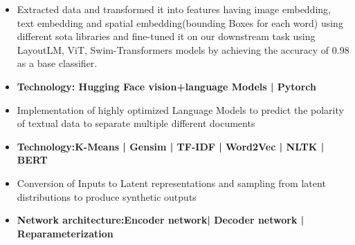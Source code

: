 
\begin{itemize}
\item Extracted data and transformed it into features having image embedding, text embedding and spatial embedding(bounding Boxes for each word) using different sota libraries and fine-tuned it on our downstream task using LayoutLM, ViT, Swim-Transformers models by achieving the accuracy of 0.98 as a base classifier.
\item\bf{Technology}{: Hugging Face vision+language Models | Pytorch}
\end{itemize}
\smallskip
{}
\begin{itemize}
\item Implementation of highly optimized Language Models to predict the polarity of textual data to separate multiple different documents
\item\bf{Technology}{:K-Means | Gensim | TF-IDF | Word2Vec | NLTK | BERT }
\end{itemize}
\smallskip
{}
\begin{itemize}
\item Conversion of Inputs to Latent representations and sampling from latent distributions to produce synthetic outputs
\item\bf{Network architecture}{:Encoder network| Decoder network | Reparameterization  }
\end{itemize}
\smallskip
\begin{itemize}
\end{itemize}
